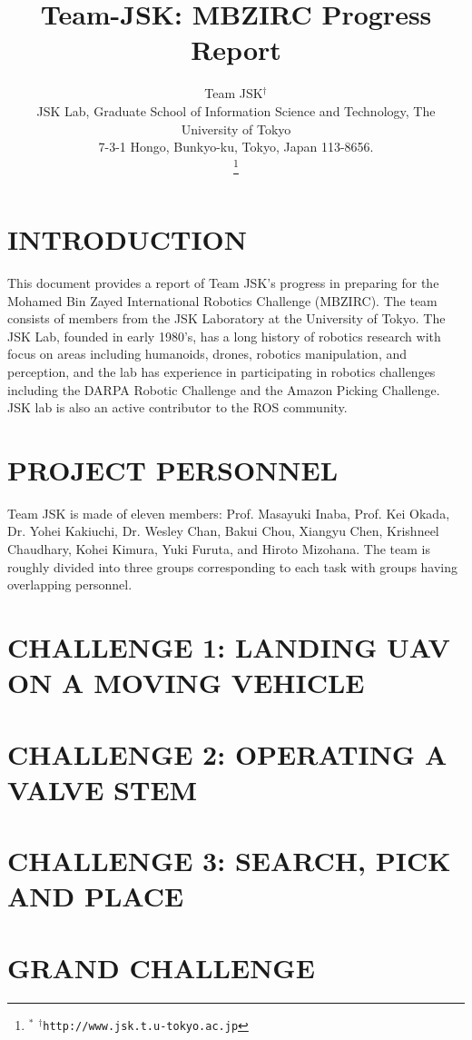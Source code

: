 \documentclass[letterpaper, 10 pt, conference]{ieeeconf}  %
\title{\LARGE \bf
  Team-JSK: MBZIRC Progress Report
}
\author{Team JSK$^\dagger$%
  \\ JSK Lab, Graduate School of Information Science and Technology, The University of Tokyo \\
  7-3-1 Hongo, Bunkyo-ku, Tokyo, Japan 113-8656.  \\
\thanks{$^{*}$ %
{$^\dagger$\tt\small http://www.jsk.t.u-tokyo.ac.jp}
}}
\begin{document}
\maketitle
\thispagestyle{empty}
\pagestyle{empty}


\section{INTRODUCTION}
This document provides a report of Team JSK's progress in preparing for the Mohamed Bin Zayed International Robotics Challenge (MBZIRC). The team consists of members from the JSK Laboratory at the University of Tokyo. The JSK Lab, founded in early 1980’s, has a long history of robotics research with focus on areas including humanoids, drones, robotics manipulation, and perception, and the lab has experience in participating in robotics challenges including the DARPA Robotic Challenge and the Amazon Picking Challenge. JSK lab is also an active contributor to the ROS community.

\section{PROJECT PERSONNEL}
Team JSK is made of eleven members: Prof. Masayuki Inaba, Prof. Kei Okada, Dr. Yohei Kakiuchi, Dr. Wesley Chan, Bakui Chou, Xiangyu Chen, Krishneel Chaudhary, Kohei Kimura, Yuki Furuta, and Hiroto Mizohana. The team is roughly divided into three groups corresponding to each task with groups having overlapping personnel.




\section{CHALLENGE 1: LANDING UAV ON A MOVING VEHICLE}





\section{CHALLENGE 2: OPERATING A VALVE STEM}


\section{CHALLENGE 3: SEARCH, PICK AND PLACE}




\section{GRAND CHALLENGE}


\end{document}
